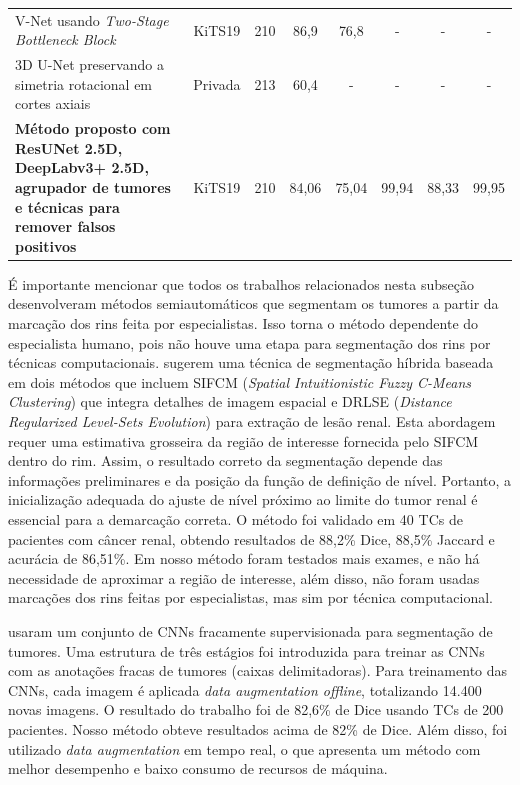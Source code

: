 \begin{table}[!ht]
{\begin{tabular}{p{11cm}ccccccc}
V-Net usando \textit{Two-Stage Bottleneck Block} \cite{turk2022kidney}                                                    & KiTS19        & 210                & 86,9              & 76,8              & -                & -                & -                \\
3D U-Net preservando a simetria rotacional em cortes axiais \cite{Tanimoto22}                                             & Privada       & 213                & 60,4              & -                 & -                & -                & -                \\ \hline
\textbf{Método proposto com ResUNet 2.5D, DeepLabv3+ 2.5D, agrupador de tumores e técnicas para remover falsos positivos} & KiTS19        & 210                & 84,06             & 75,04             & 99,94            & 88,33            & 99,95            \\ \hline
\end{tabular}
}
\end{table}

É importante mencionar que todos os trabalhos relacionados nesta subseção desenvolveram métodos semiautomáticos que segmentam os tumores a partir da marcação dos rins feita por especialistas. Isso torna o método dependente do especialista humano, pois não houve uma etapa para segmentação dos rins por técnicas computacionais.  sugerem uma técnica de segmentação híbrida baseada em dois métodos que incluem SIFCM (\textit{Spatial Intuitionistic Fuzzy C-Means Clustering}) que integra detalhes de imagem espacial e DRLSE (\textit{Distance Regularized Level-Sets Evolution}) para extração de lesão renal. Esta abordagem requer uma estimativa grosseira da região de interesse fornecida pelo SIFCM dentro do rim. Assim, o resultado correto da segmentação depende das informações preliminares e da posição da função de definição de nível. Portanto, a inicialização adequada do ajuste de nível próximo ao limite do tumor renal é essencial para a demarcação correta. O método foi validado em 40 TCs de pacientes com câncer renal, obtendo resultados de 88,2\% Dice, 88,5\% Jaccard e acurácia de 86,51\%. Em nosso método foram testados mais exames, e não há necessidade de aproximar a região de interesse, além disso, não foram usadas marcações dos rins feitas por especialistas, mas sim por técnica computacional.

 usaram um conjunto de CNNs fracamente supervisionada para segmentação de tumores. Uma estrutura de três estágios foi introduzida para treinar as CNNs com as anotações fracas de tumores (caixas delimitadoras). Para treinamento das CNNs, cada imagem é aplicada \textit{data augmentation offline}, totalizando 14.400 novas imagens. O resultado do trabalho foi de 82,6\% de Dice usando TCs de 200 pacientes. Nosso método obteve resultados acima de 82\% de Dice. Além disso, foi utilizado \textit{data augmentation} em tempo real, o que apresenta um método com melhor desempenho e baixo consumo de recursos de máquina.

